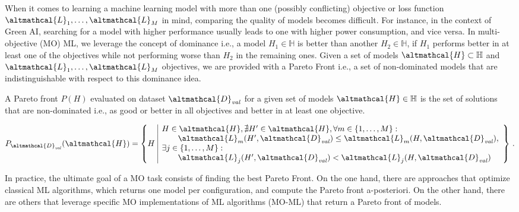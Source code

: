 When it comes to learning a machine learning model with more than one (possibly conflicting) objective or loss function $\altmathcal{L}_1, \dots, \altmathcal{L}_M$ in mind, comparing the quality of models becomes difficult.
For instance, in the context of Green AI, searching for a model with higher performance usually leads to one with higher power consumption, and vice versa.
In multi-objective (MO) ML, we leverage the concept of dominance i.e., a model $H_1 \in \mathbb{H}$ is better than another $H_2 \in \mathbb{H}$, if $H_1$ performs better in at least one of the objectives while not performing worse than $H_2$ in the remaining ones.
Given a set of models $\altmathcal{H} \subset \mathbb{H}$ and $\altmathcal{L}_1, \dots, \altmathcal{L}_M$ objectives, we are provided with a Pareto Front i.e., a set of non-dominated models that are indistinguishable with respect to this dominance idea.

\begin{definition}
    A Pareto front $P(H)$ evaluated on dataset $\altmathcal{D}_{\mathit{val}}$ for a given set of models $\altmathcal{H} \in \mathbb{H}$ is the set of solutions that are non-dominated i.e., as good or better in all objectives and better in at least one objective.

    \begin{equation*}
        \label{eq:pareto_def}
            P_{\altmathcal{D}_{\mathit{val}}}(\altmathcal{H}) = \left\{ H \,\, \begin{array}{|l}
            H \in \altmathcal{H}, \nexists H' \in \altmathcal{H},
            \forall m \in \{1, \dots, M\} : \\
            \quad\quad\altmathcal{L}_m(H',\altmathcal{D}_{\mathit{val}}) \leq \altmathcal{L}_m(H,\altmathcal{D}_{\mathit{val}}), \\
            \exists j \in \{1, \dots, M\} : \\
            \quad\quad\altmathcal{L}_j(H',\altmathcal{D}_{\mathit{val}}) < \altmathcal{L}_j(H, \altmathcal{D}_{\mathit{val}})
            \end{array}\right\} \, .
        \end{equation*}
\end{definition}

In practice, the ultimate goal of a MO task consists of finding the best Pareto Front.
On the one hand, there are approaches that optimize classical ML algorithms, which returns one model per configuration, and compute the Pareto front a-posteriori.
On the other hand, there are others that leverage specific MO implementations of ML algorithms (MO-ML) that return a Pareto front of models.

